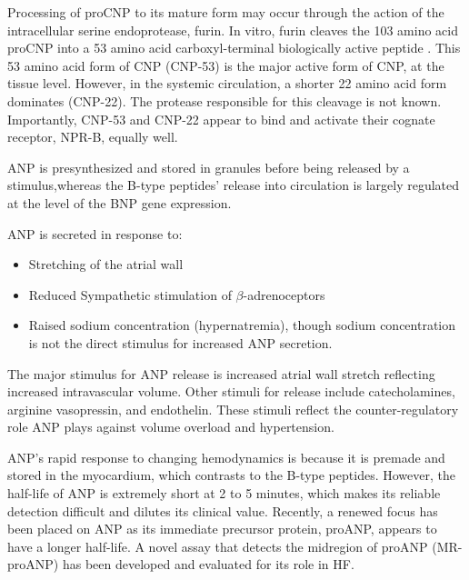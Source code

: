\documentclass[14pt,a4paper,onecolumn]{extarticle}
\begin{document}
Processing of proCNP to its mature form may occur through the action of the intracellular serine endoprotease, furin. In vitro, furin cleaves the 103 amino acid proCNP into a 53 amino acid carboxyl-terminal biologically active peptide \citep{Wu2003a}. This 53 amino acid form of CNP (CNP-53) is the major active form of CNP, at the tissue level. However, in the systemic circulation, a shorter 22 amino acid form dominates (CNP-22). The protease responsible for this cleavage is not known. Importantly, CNP-53 and CNP-22 appear to bind and activate their cognate receptor, NPR-B, equally well. %

ANP is presynthesized and stored in granules before being released by a stimulus,whereas the B-type peptides’ release into circulation is largely regulated at the level of the BNP gene expression. \citep{Gaggin2014} %

ANP is secreted in response to:      \begin{itemize}          \item Stretching of the atrial wall  \item Reduced Sympathetic stimulation of $\beta$-adrenoceptors          \item Raised sodium concentration (hypernatremia), though sodium concentration is not the direct stimulus for increased ANP secretion. \citep{Widmaier2008} \end{itemize} %

The major stimulus for ANP release is increased atrial wall stretch reflecting increased intravascular volume.  Other stimuli for release include catecholamines, arginine vasopressin, and endothelin.  These stimuli reflect the counter-regulatory role ANP plays against volume overload and hypertension.  \citep{Maisel2018} %

ANP’s rapid response to changing hemodynamics is because it is premade and stored in the myocardium, which contrasts to the B-type peptides. However, the half-life of ANP is extremely short at 2 to 5 minutes, which makes its reliable detection difficult and dilutes its clinical value. Recently, a renewed focus has been placed on ANP as its immediate precursor protein, proANP, appears to have a longer half-life. A novel assay that detects the midregion of proANP (MR-proANP) has been developed and evaluated for its role in HF. \citep{Gaggin2014} %

\end{document}
